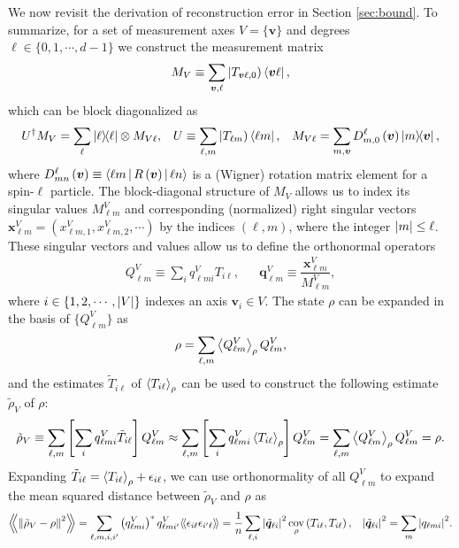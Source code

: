 \documentclass[notitlepage,twocolumn]{revtex4-2}
\newcommand{\f}[2]{\dfrac{#1}{#2}} %
\newcommand{\p}[1]{\left(#1\right)} %
\renewcommand{\sp}[1]{\left[#1\right]} %
\newcommand{\bk}{\Braket} %
\renewcommand{\v}{\bm} %
\renewcommand{\set}[1]{\{#1\}} %
\newcommand{\bbk}[1]{\langle\!\langle #1 \rangle\!\rangle}
\newcommand{\Bbk}[1]
{\left\langle\!\!\left\langle #1 \right\rangle\!\!\right\rangle}
\def\oket#1{\mathinner{|{#1})}}
\DeclareMathOperator{\cov}{cov}
\newcommand{\1}{\mathds{1}}
\begin{document}
We now revisit the derivation of reconstruction error in Section \ref{sec:bound}.
To summarize, for a set of measurement axes $V=\set{\v v}$ and degrees $\ell\in\set{0,1,\cdots,d-1}$ we construct the measurement matrix
\begin{align}
  M_V \equiv \sum_{\v v,\ell} \oket{T_{\v v\ell,0}} \bra{\v v\ell},
\end{align}
which can be block diagonalized as
\begin{align}
  U^\dag M_V = \sum_\ell \op{\ell} \otimes M_{V\ell},
  &&
  U \equiv \sum_{\ell,m} \oket{T_{\ell m}} \bra{\ell m},
  &&
  M_{V\ell} = \sum_{m,\v v} D^\ell_{m,0}\p{\v v} \op{m}{\v v},
\end{align}
where $D^\ell_{mn}\p{\v v}\equiv\bk{\ell m|R\p{\v v}|\ell n}$ is a (Wigner) rotation matrix element for a spin-$\ell$ particle.
The block-diagonal structure of $M_V$ allows us to index its singular values $M^V_{\ell m}$ and corresponding (normalized) right singular vectors $\v x^V_{\ell m} = (x^V_{\ell m,1}, x^V_{\ell m,2}, \cdots )$ by the indices $\p{\ell,m}$, where the integer $\abs{m}\le\ell$.
These singular vectors and values allow us to define the orthonormal operators
\begin{align}
  Q^V_{\ell m} \equiv \sum_i q^V_{\ell mi} T_{i\ell},
  &&
  \v q^V_{\ell m} \equiv \f{\v x^V_{\ell m}}{M^V_{\ell m}},
\end{align}
where $i\in\set{1,2,\cdots,\abs{V}}$ indexes an axis $\v v_i\in V$.
The state $\rho$ can be expanded in the basis of $\set{Q^V_{\ell m}}$ as
\begin{align}
  \rho = \sum_{\ell,m} \bk{Q^V_{\ell m}}_\rho Q^V_{\ell m},
\end{align}
and the estimates $\tilde T_{i\ell}$ of $\bk{T_{i\ell}}_\rho$ can be used to construct the following estimate $\tilde\rho_V$ of $\rho$:
\begin{align}
  \tilde\rho_V \equiv \sum_{\ell,m}
  \sp{\sum_i q^V_{\ell mi} \tilde T_{i\ell}} Q^V_{\ell m}
  \approx \sum_{\ell,m}
  \sp{\sum_i q^V_{\ell mi} \bk{T_{i\ell}}_\rho} Q^V_{\ell m}
  = \sum_{\ell,m} \bk{Q^V_{\ell m}}_\rho Q^V_{\ell m}
  = \rho.
\end{align}
Expanding $\tilde T_{i\ell} = \bk{T_{i\ell}}_\rho + \epsilon_{i\ell}$, we can use orthonormality of all $Q^V_{\ell m}$ to expand the mean squared distance between $\tilde\rho_V$ and $\rho$ as
\begin{align}
  \Bbk{\norm{\tilde\rho_V-\rho}^2}
  = \sum_{\ell,m,i,i'} \p{q^V_{\ell mi}}^* q^V_{\ell mi'} \bbk{\epsilon_{i\ell} \epsilon_{i'\ell}}
  = \f1n \sum_{\ell,i} \abs{\tilde{\v q}_{\ell i}}^2 \cov_\rho\p{T_{i\ell},T_{i\ell}},
  &&
  \abs{\tilde{\v q}_{\ell i}}^2 = \sum_m \abs{q_{\ell mi}}^2.
  \label{eq:error_SM_start}
\end{align}
\end{document}
